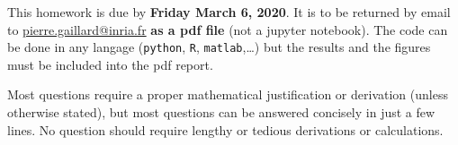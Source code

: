 \documentclass[a4paper, 11pt]{article}
\makeatletter
\newcommand{\email}{pierre.gaillard@inria.fr}
\makeatother
\begin{document}
\worknumber{}

\maketitle

This homework is due by {\bfseries Friday March 6, 2020}. It is to be returned by email to \href{mailto:\email}{\email} {\bfseries as a pdf file} (not a jupyter notebook). The code can be done in any langage (\texttt{python}, \texttt{R}, \texttt{matlab},\dots) but the results and the figures must be included into the pdf report. 

\medskip
Most questions require a proper mathematical justification or derivation (unless otherwise stated), but most questions can be answered concisely in just a few lines. No question should require lengthy or tedious derivations or calculations.










\end{document}

